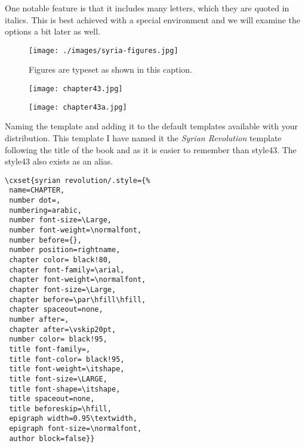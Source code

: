 One notable feature is that it includes many letters, which they are quoted in italics. This is best achieved
with a special environment and we will examine the options a bit later as well.

\example
\begin{figure}[ht]
\centering
\texttt{[image: ./images/syria-figures.jpg]}
\caption{Figures are typeset as shown in this caption.}
\end{figure}



\begin{figure}[ht]
\centering
\texttt{[image: chapter43.jpg]}\par
\texttt{[image: chapter43a.jpg]}
\end{figure}
\everypar{}


\example Naming the template and adding it to the default templates available with your distribution. This template I have named it the \textit{Syrian Revolution} template following the title of the book and as it is
easier to remember than style43. The style43 also exists as an alias. 

\begin{verbatim}
\cxset{syrian revolution/.style={%
 name=CHAPTER,
 number dot=,
 numbering=arabic,
 number font-size=\Large,
 number font-weight=\normalfont,
 number before={},
 number position=rightname,
 chapter color= black!80,
 chapter font-family=\arial,
 chapter font-weight=\normalfont,
 chapter font-size=\Large,
 chapter before=\par\hfill\hfill,
 chapter spaceout=none,
 number after=,
 chapter after=\vskip20pt,
 number color= black!95,
 title font-family=,
 title font-color= black!95,
 title font-weight=\itshape,
 title font-size=\LARGE,
 title font-shape=\itshape,
 title spaceout=none,
 title beforeskip=\hfill,
 epigraph width=0.95\textwidth,
 epigraph font-size=\normalfont,
 author block=false}}

\end{verbatim}















